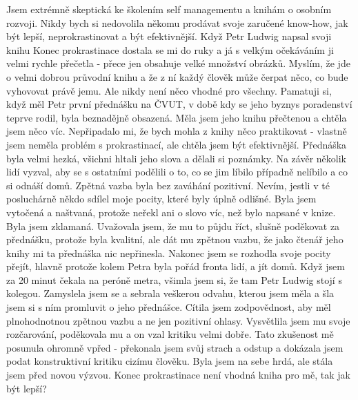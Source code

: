 \documentclass[a4paper]{scrartcl}
\begin{document}
\indent Jsem extrémně skeptická ke školením self managementu a knihám o osobním rozvoji. Nikdy bych si nedovolila někomu prodávat svoje zaručené know-how, jak 
být lepší, neprokrastinovat a být efektivnější. Když Petr Ludwig napsal svoji knihu Konec prokrastinace \cite{ludwig2013} dostala se mi do ruky a já s velkým 
očekáváním ji velmi rychle přečetla - přece jen obsahuje velké množství obrázků. Myslím, že jde o velmi dobrou průvodní knihu a že z ní každý člověk může čerpat 
něco, co bude vyhovovat právě jemu. Ale nikdy není něco vhodné pro všechny. Pamatuji si, když měl Petr první přednášku na ČVUT, v době kdy se jeho byznys 
poradenství teprve rodil, byla beznadějně obsazená. Měla jsem jeho knihu přečtenou a chtěla jsem něco víc. Nepřipadalo mi, že bych mohla z knihy něco praktikovat 
- vlastně jsem neměla problém s prokrastinací, ale chtěla jsem být efektivnější. Přednáška byla velmi hezká, všichni hltali jeho slova a dělali si poznámky. Na 
závěr několik lidí vyzval, aby se s ostatními podělili o to, co se jim líbilo případně nelíbilo a co si odnáší domů. Zpětná vazba byla bez zaváhání pozitivní. 
Nevím, jestli v té posluchárně někdo sdílel moje pocity, které byly úplně odlišné. Byla jsem vytočená a naštvaná, protože neřekl ani o slovo víc, než bylo 
napsané v knize. Byla jsem zklamaná. Uvažovala jsem, že mu to půjdu říct, slušně poděkovat za přednášku, protože byla kvalitní, ale dát mu zpětnou vazbu, že jako 
čtenář jeho knihy mi ta přednáška nic nepřinesla. Nakonec jsem se rozhodla svoje pocity přejít, hlavně protože kolem Petra byla pořád fronta lidí, a jít domů. 
Když jsem za 20 minut čekala na peróně metra, všimla jsem si, že tam Petr Ludwig stojí s kolegou. Zamyslela jsem se a sebrala veškerou odvahu, kterou jsem měla a 
šla jsem si s ním promluvit o jeho přednášce. Cítila jsem zodpovědnost, aby měl plnohodnotnou zpětnou vazbu a ne jen pozitivní ohlasy. Vysvětlila jsem mu svoje 
rozčarování, poděkovala mu a on vzal kritiku velmi dobře. Tato zkušenost mě posunula ohromně vpřed - překonala jsem svůj strach a odstup a dokázala jsem podat 
konstruktivní kritiku cizímu člověku. Byla jsem na sebe hrdá, ale stála jsem před novou výzvou. Konec prokrastinace není vhodná kniha pro mě, tak jak být lepší? 
\\
\end{document}

